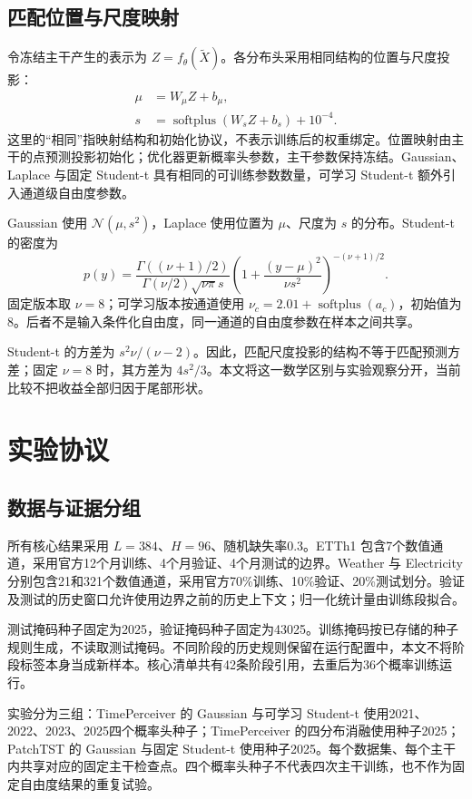 \documentclass[11pt,a4paper,twocolumn]{article}
\begin{document}
\subsection{匹配位置与尺度映射}
令冻结主干产生的表示为 $Z=f_{\theta}(\widetilde X)$。各分布头采用相同结构的位置与尺度投影：
\begin{align}
 \mu &= W_{\mu}Z+b_{\mu},\\
 s &= \operatorname{softplus}(W_sZ+b_s)+10^{-4}.
\end{align}
这里的“相同”指映射结构和初始化协议，不表示训练后的权重绑定。位置映射由主干的点预测投影初始化；优化器更新概率头参数，主干参数保持冻结。Gaussian、Laplace 与固定 Student-t 具有相同的可训练参数数量，可学习 Student-t 额外引入通道级自由度参数。

Gaussian 使用 $\mathcal N(\mu,s^2)$，Laplace 使用位置为 $\mu$、尺度为 $s$ 的分布。Student-t 的密度为
\begin{equation}
 p(y)=\frac{\Gamma((\nu+1)/2)}{\Gamma(\nu/2)\sqrt{\nu\pi}s}
 \left(1+\frac{(y-\mu)^2}{\nu s^2}\right)^{-(\nu+1)/2}.
\end{equation}
固定版本取 $\nu=8$；可学习版本按通道使用 $\nu_c=2.01+\operatorname{softplus}(a_c)$，初始值为8。后者不是输入条件化自由度，同一通道的自由度参数在样本之间共享。

Student-t 的方差为 $s^2\nu/(\nu-2)$。因此，匹配尺度投影的结构不等于匹配预测方差；固定 $\nu=8$ 时，其方差为 $4s^2/3$。本文将这一数学区别与实验观察分开，当前比较不把收益全部归因于尾部形状。

\section{实验协议}
\subsection{数据与证据分组}
所有核心结果采用 $L=384$、$H=96$、随机缺失率0.3。ETTh1 包含7个数值通道，采用官方12个月训练、4个月验证、4个月测试的边界。Weather 与 Electricity 分别包含21和321个数值通道，采用官方70\%训练、10\%验证、20\%测试划分。验证及测试的历史窗口允许使用边界之前的历史上下文；归一化统计量由训练段拟合。

测试掩码种子固定为2025，验证掩码种子固定为43025。训练掩码按已存储的种子规则生成，不读取测试掩码。不同阶段的历史规则保留在运行配置中，本文不将阶段标签本身当成新样本。核心清单共有42条阶段引用，去重后为36个概率训练运行。

实验分为三组：TimePerceiver 的 Gaussian 与可学习 Student-t 使用2021、2022、2023、2025四个概率头种子；TimePerceiver 的四分布消融使用种子2025；PatchTST 的 Gaussian 与固定 Student-t 使用种子2025。每个数据集、每个主干内共享对应的固定主干检查点。四个概率头种子不代表四次主干训练，也不作为固定自由度结果的重复试验。
\end{document}
